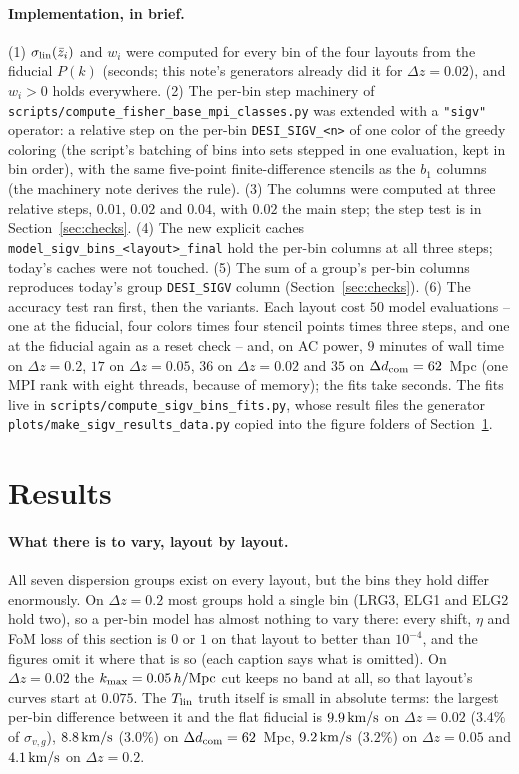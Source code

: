 \documentclass[11pt]{article}
\newcommand{\svg}{\sigma_{v,g}}
\newcommand{\slin}{\sigma_{\rm lin}}
\newcommand{\kms}{\,{\rm km/s}}
\newcommand{\hMpc}{\,h/{\rm Mpc}}
\newcommand{\kmax}{k_{\rm max}}
\newcommand{\dcom}{$\Delta d_{\rm com} = 62$~Mpc}
\newcommand{\us}{\_\allowbreak}
\begin{document}
\paragraph{Implementation, in brief.}
(1) $\slin(\bar{z}_i)$ and $w_i$ were computed for every bin of the
four layouts from the fiducial $P(k)$ (seconds; this note's generators
already did it for $\Delta z = 0.02$), and $w_i > 0$ holds everywhere.
(2) The per-bin step machinery of
\texttt{scripts/compute\us fisher\us base\us mpi\us classes.py} was
extended with a \texttt{"sigv"} operator: a relative step on the
per-bin \texttt{DESI\us SIGV\us <n>} of one color of the greedy
coloring (the script's batching of bins into sets stepped in one
evaluation, kept in bin order), with the same five-point
finite-difference stencils as the $b_1$ columns (the machinery note
derives the rule).  (3) The columns were computed at three relative
steps, $0.01$, $0.02$ and $0.04$, with $0.02$ the main step; the step
test is in Section~\ref{sec:checks}.  (4) The new explicit caches
\texttt{model\us sigv\us bins\us <layout>\us final} hold the per-bin
columns at all three steps; today's caches were not touched.  (5) The
sum of a group's per-bin columns reproduces today's group
\texttt{DESI\us SIGV} column (Section~\ref{sec:checks}).  (6) The
accuracy test ran first, then the variants.  Each layout cost $50$
model evaluations -- one at the fiducial, four colors times four
stencil points times three steps, and one at the fiducial again as a
reset check -- and, on AC power, $9$ minutes of wall time on
$\Delta z = 0.2$, $17$ on $\Delta z = 0.05$, $36$ on
$\Delta z = 0.02$ and $35$ on \dcom{} (one MPI rank with eight
threads, because of memory); the fits take seconds.  The fits live in
\texttt{scripts/compute\us sigv\us bins\us fits.py}, whose result
files the generator \texttt{plots/make\us sigv\us results\us data.py}
copied into the figure folders of Section~\ref{sec:results}.

\section{Results}
\label{sec:results}

\paragraph{What there is to vary, layout by layout.}
All seven dispersion groups exist on every layout, but the bins they
hold differ enormously.  On $\Delta z = 0.2$ most groups hold a single
bin (LRG3, ELG1 and ELG2 hold two), so a per-bin model has almost
nothing to vary there: every shift, $\eta$ and FoM loss of this
section is $0$ or $1$ on that layout to better than $10^{-4}$, and
the figures omit it where that is so (each caption says what is
omitted).  On $\Delta z = 0.02$ the $\kmax = 0.05\hMpc$ cut keeps no
band at all, so that layout's curves start at $0.075$.  The
$T_{\rm lin}$ truth itself is small in absolute terms: the largest
per-bin difference between it and the flat fiducial is $9.9\kms$ on
$\Delta z = 0.02$ ($3.4\%$ of $\svg$), $8.8\kms$ ($3.0\%$) on \dcom,
$9.2\kms$ ($3.2\%$) on $\Delta z = 0.05$ and $4.1\kms$ on
$\Delta z = 0.2$.
\end{document}
